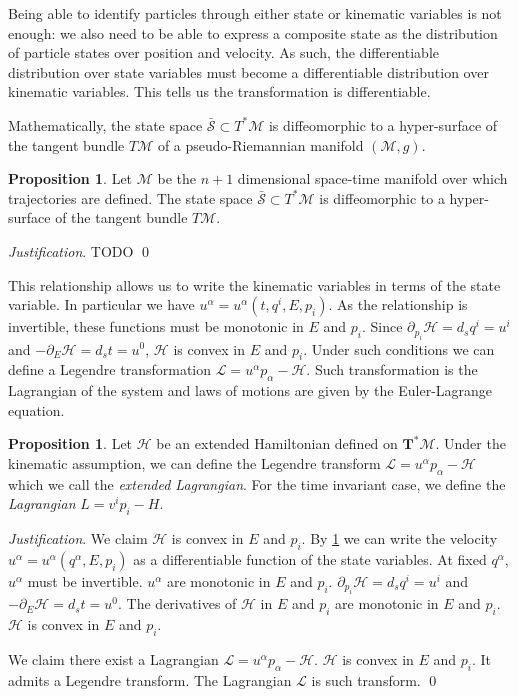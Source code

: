 \documentclass[aps,pra,10pt,twocolumn,floatfix,nofootinbib]{revtex4-1}
\numberwithin{equation}{section}
\theoremstyle{definition}
\newtheorem{prop}[equation]{Proposition}
\newenvironment{justification}{\emph{Justification}.}{\qed}
\begin{document}
Being able to identify particles through either state or kinematic variables is not enough: we also need to be able to express a composite state as the distribution of particle states over position and velocity. As such, the differentiable distribution over state variables must become a differentiable distribution over kinematic variables. This tells us the transformation is differentiable.

Mathematically, the state space $\bar{\mathcal{S}} \subset T^*\mathcal{M}$ is diffeomorphic to a hyper-surface of the tangent bundle $T\mathcal{M}$ of a pseudo-Riemannian manifold $(\mathcal{M}, g)$.

\begin{prop}\label{initial_conditions}
	Let $\mathcal{M}$ be the $n+1$ dimensional space-time manifold over which trajectories are defined. The state space $\bar{\mathcal{S}} \subset T^*\mathcal{M}$ is diffeomorphic to a hyper-surface of the tangent bundle $T\mathcal{M}$.
\end{prop}

\begin{justification}
	TODO
\end{justification}

This relationship allows us to write the kinematic variables in terms of the state variable. In particular we have $u^\alpha=u^\alpha(t, q^i, E, p_i)$. As the relationship is invertible, these functions must be monotonic in $E$ and $p_i$. Since $\partial_{p_i} \mathcal{H}=d_s q^i= u^i$ and $- \partial_{E} \mathcal{H}= d_s t= u^0$, $\mathcal{H}$ is convex in $E$ and $p_i$. Under such conditions we can define a Legendre transformation $\mathcal{L}=u^\alpha p_\alpha - \mathcal{H}$. Such transformation is the Lagrangian of the system and laws of motions are given by the Euler-Lagrange equation.

\begin{prop}\label{lagrangian_mechanics}
	Let $\mathcal{H}$ be an extended Hamiltonian defined on $\mathbf{T}^*\mathcal{M}$. Under the kinematic assumption, we can define the Legendre transform $\mathcal{L}=u^\alpha p_\alpha - \mathcal{H}$ which we call the \emph{extended Lagrangian}. For the time invariant case, we define the \emph{Lagrangian} $L=v^i p_i - H$.
\end{prop}

\begin{justification}
	We claim $\mathcal{H}$ is convex in $E$ and $p_i$. By \ref{initial_conditions} we can write the velocity $u^\alpha=u^\alpha(q^\alpha, E, p_i)$ as a differentiable function of the state variables. At fixed $q^\alpha$, $u^\alpha$ must be invertible. $u^\alpha$ are monotonic in $E$ and $p_i$. $\partial_{p_i} \mathcal{H}=d_s q^i= u^i$ and $- \partial_{E} \mathcal{H}= d_s t= u^0$. The derivatives of $\mathcal{H}$ in $E$ and $p_i$ are monotonic in $E$ and $p_i$. $\mathcal{H}$ is convex in $E$ and $p_i$.
	
	We claim there exist a Lagrangian $\mathcal{L}=u^\alpha p_\alpha - \mathcal{H}$. $\mathcal{H}$ is convex in $E$ and $p_i$. It admits a Legendre transform. The Lagrangian $\mathcal{L}$ is such transform.
\end{justification}
\end{document}
